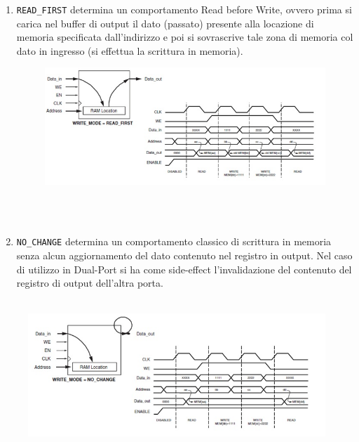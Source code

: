 \begin{itemize}
\begin{enumerate}
\item \texttt{READ\_FIRST} determina un comportamento Read before Write, ovvero prima si carica nel buffer di output il dato (passato) presente alla locazione di memoria specificata dall'indirizzo e poi si sovrascrive tale zona di memoria col dato in ingresso (si effettua la scrittura in memoria). 

\begin{figure}[!h]
\centering
\includegraphics[width=\textwidth]{img/blockRam/readFirst.jpg}
\label{fig:set_ass}
\end{figure}\\\\

\item \texttt{NO\_CHANGE} determina un comportamento classico di scrittura in memoria senza alcun aggiornamento del dato contenuto nel registro in output. Nel caso di utilizzo in Dual-Port si ha come side-effect l'invalidazione del contenuto del registro di output dell'altra porta.\\\\
\end{enumerate}

\begin{figure}[!h]
\centering
\includegraphics[width=\textwidth]{img/blockRam/noChange.jpg}
\label{fig:set_ass}
\end{figure}

\end{itemize}

